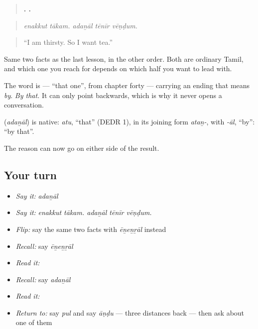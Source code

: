 \begin{quote}
\textbf{ .   .}
\end{quote}

\begin{quote}
\emph{enakkut tākam. adaṉāl tēnīr vēṇḍum.}
\end{quote}

\begin{quote}
\textquotedblleft{}I am thirsty. So I want tea.\textquotedblright{}
\end{quote}

Same two facts as the last lesson, in the other order. Both are ordinary Tamil, and which one you reach for depends on which half you want to lead with.

The word is \textbf{} — \textquotedblleft{}that one\textquotedblright{}, from chapter forty — carrying an ending that means \emph{by}. \emph{By that.} It can only point backwards, which is why it never opens a conversation.

\begin{cousinweb}
\textbf{} (\emph{adaṉāl}) is native: \emph{atu}, \textquotedblleft{}that\textquotedblright{} (DEDR 1), in its joining form \emph{ataṉ-}, with \emph{-āl}, \textquotedblleft{}by\textquotedblright{}: \textquotedblleft{}by that\textquotedblright{}.
\end{cousinweb}

\begin{grammarlens}[title={What you've built}]
The reason can now go on either side of the result.
\end{grammarlens}

\subsection*{Your turn}
\begin{itemize}
\raggedright
  \item \emph{Say it:} \emph{adaṉāl}
  \item \emph{Say it:} \emph{enakkut tākam. adaṉāl tēnīr vēṇḍum.}
  \item \emph{Flip:} say the same two facts with \emph{ēṉeṉṟāl} instead
  \item \emph{Recall:} say \emph{ēṉeṉṟāl}
  \item \emph{Read it:} \textbf{}
  \item \emph{Recall:} say \emph{adaṉāl}
  \item \emph{Read it:} \textbf{}
  \item \emph{Return to:} say \emph{pul} and say \emph{āṇḍu} — three distances back — then ask  about one of them
\end{itemize}

